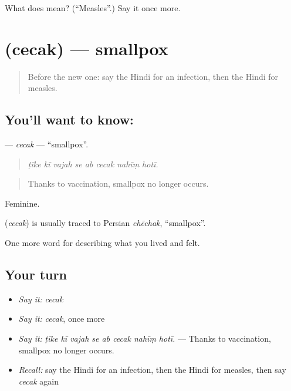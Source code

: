 \begin{tcolorbox}[breakable,colback=teal!4,colframe=teal!35!black,title={Before you move on}]
What does  mean? (\textquotedblleft{}Measles\textquotedblright{}.) Say it once more.
\end{tcolorbox}
\section[\texorpdfstring{\hi{चेचक} (cecak)}{चेचक (cecak)}]{ (cecak) — smallpox}

\label{lesson:HI-C487-cecak}



\begin{quote}
Before the new one: say the Hindi for an infection, then the Hindi for measles.
\end{quote}

\subsection*{You'll want to know: }
\textbf{} — \emph{cecak} — \textquotedblleft{}smallpox\textquotedblright{}.

\begin{quote}
       
\end{quote}

\begin{quote}
\emph{ṭīke kī vajah se ab cecak nahīṃ hotī.}
\end{quote}

\begin{quote}
Thanks to vaccination, smallpox no longer occurs.
\end{quote}

Feminine.

\begin{cousinweb}
\textbf{} (\emph{cecak}) is usually traced to Persian \emph{chēchak}, \textquotedblleft{}smallpox\textquotedblright{}.
\end{cousinweb}

\begin{grammarlens}[title={What you've built}]
One more word for describing what you lived and felt.
\end{grammarlens}

\subsection*{Your turn}
\begin{itemize}
\raggedright
  \item \emph{Say it:} \emph{cecak}
  \item \emph{Say it:} \emph{cecak}, once more
  \item \emph{Say it:} \emph{ṭīke kī vajah se ab cecak nahīṃ hotī.} — Thanks to vaccination, smallpox no longer occurs.
  \item \emph{Recall:} say the Hindi for an infection, then the Hindi for measles, then say \emph{cecak} again
\end{itemize}


